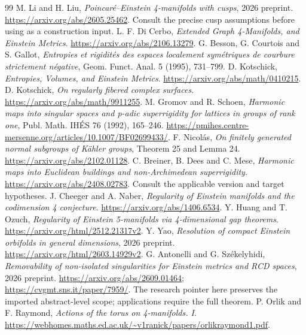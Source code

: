 \documentclass[11pt]{article}
\theoremstyle{definition}\newtheorem{problem}[theorem]{Open problem}
\theoremstyle{remark}\newtheorem{remark}[theorem]{Scope}
\numberwithin{equation}{section}
\begin{document}
\begin{thebibliography}{99}
 M. Li and H. Liu, \emph{Poincar\'e--Einstein 4-manifolds with cusps}, 2026 preprint. \url{https://arxiv.org/abs/2605.25462}. Consult the precise cusp assumptions before using as a construction input.
 L. F. Di Cerbo, \emph{Extended Graph 4-Manifolds, and Einstein Metrics}. \url{https://arxiv.org/abs/2106.13279}.
 G. Besson, G. Courtois and S. Gallot, \emph{Entropies et rigidit\'es des espaces localement sym\'etriques de courbure strictement n\'egative}, Geom. Funct. Anal. 5 (1995), 731--799.
 D. Kotschick, \emph{Entropies, Volumes, and Einstein Metrics}. \url{https://arxiv.org/abs/math/0410215}.
 D. Kotschick, \emph{On regularly fibered complex surfaces}. \url{https://arxiv.org/abs/math/9911255}.
 M. Gromov and R. Schoen, \emph{Harmonic maps into singular spaces and p-adic superrigidity for lattices in groups of rank one}, Publ. Math. IH\'ES 76 (1992), 165--246. \url{https://pmihes.centre-mersenne.org/articles/10.1007/BF02699433/}.
 F. Nicol\'as, \emph{On finitely generated normal subgroups of K\"ahler groups}, Theorem 25 and Lemma 24. \url{https://arxiv.org/abs/2102.01128}.
 C. Breiner, B. Dees and C. Mese, \emph{Harmonic maps into Euclidean buildings and non-Archimedean superrigidity}. \url{https://arxiv.org/abs/2408.02783}. Consult the applicable version and target hypotheses.
 J. Cheeger and A. Naber, \emph{Regularity of Einstein manifolds and the codimension 4 conjecture}. \url{https://arxiv.org/abs/1406.6534}.
 Y. Huang and T. Ozuch, \emph{Regularity of Einstein 5-manifolds via 4-dimensional gap theorems}. \url{https://arxiv.org/html/2512.21317v2}.
 Y. Yao, \emph{Resolution of compact Einstein orbifolds in general dimensions}, 2026 preprint. \url{https://arxiv.org/html/2603.14929v2}.
 G. Antonelli and G. Sz\'ekelyhidi, \emph{Removability of non-isolated singularities for Einstein metrics and RCD spaces}, 2026 preprint. \url{https://arxiv.org/abs/2609.01464}; \url{https://cvgmt.sns.it/paper/7959/}. The research pointer here preserves the imported abstract-level scope; applications require the full theorem.
 P. Orlik and F. Raymond, \emph{Actions of the torus on 4-manifolds. I}. \url{https://webhomes.maths.ed.ac.uk/~v1ranick/papers/orlikraymond1.pdf}.
\end{thebibliography}
\end{document}
